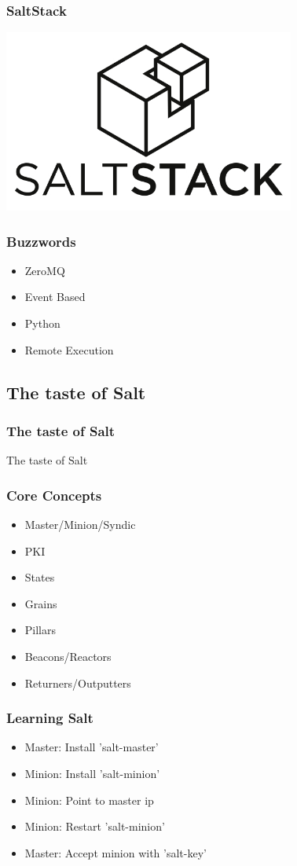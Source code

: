 \frame
{
  \frametitle{SaltStack}

  \begin{center}%
    \includegraphics[height=6cm]{images/saltstack_logo.jpg}
  \end{center}%
}

\frame
{
  \frametitle{Buzzwords}
  \begin{itemize}
  \item<1-> ZeroMQ
  \item<2-> Event Based
  \item<3-> Python
  \item<4-> Remote Execution
  \end{itemize}
}

\subsection{The taste of Salt}
\frame
{
  \frametitle{The taste of Salt}

  \begin{center}%
    \Huge The taste of Salt
  \end{center}%
}

\frame
{
  \frametitle{Core Concepts}
  \begin{itemize}
  \item<1-> Master/Minion/Syndic
  \item<2-> PKI
  \item<3-> States
  \item<4-> Grains
  \item<5-> Pillars
  \item<6-> Beacons/Reactors
  \item<7-> Returners/Outputters
  \end{itemize}
}

\frame
{
  \frametitle{Learning Salt}
  \begin{itemize}
  \item<1-> Master: Install 'salt-master'
  \item<2-> Minion: Install 'salt-minion'
  \item<3-> Minion: Point to master ip
  \item<4-> Minion: Restart 'salt-minion'
  \item<5-> Master: Accept minion with 'salt-key'
  \end{itemize}
}

